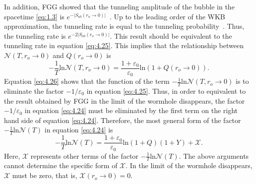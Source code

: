 \documentclass[12pt]{article}
\begin{document}
In addition, FGG showed that the tunneling amplitude of the bubble in the spacetime \eqref{eq:1.3} is $e^{-|S_{ab}(r_{o}\rightarrow 0)|}$~\cite{EAJ}. Up to the leading order of the WKB approximation, the tunneling rate is equal to the tunneling probability~\cite{SFVF,EJW}. Thus, the tunneling rate is $e^{-2|S_{ab}(r_{o}\rightarrow 0)|}$. This result should be equivalent to the tunneling rate in equation \eqref{eq:4.25}. This implies that the relationship between $\mathscr{N}(T, r_{o}\rightarrow 0 )$ and $Q(r_{o}\rightarrow 0)$ is
\begin{equation}
\label{eq:4.26}%
-\frac{1}{T}\mathrm{ln}\mathscr{N}(T, r_{o}\rightarrow 0 )=\frac{1+\varepsilon_{0}}{\varepsilon_{0}}\mathrm{ln}(1+Q(r_{o}\rightarrow0)).
\end{equation}
Equation \eqref{eq:4.26} shows that the function of the term $-\frac{1}{T}\mathrm{ln}\mathscr{N}(T, r_{o}\rightarrow 0 )$ is to eliminate the factor $-1/\varepsilon_{0}$ in equation \eqref{eq:4.25}. Thus, in order to equivalent to the result obtained by FGG in the limit of the wormhole disappears, the factor $-1/\varepsilon_{0}$ in equation \eqref{eq:4.24} must be eliminated by the first term on the right hand side of equation \eqref{eq:4.24}. Therefore, the most general form of the factor $-\frac{1}{T}\mathrm{ln}\mathscr{N}(T)$ in equation \eqref{eq:4.24} is
\begin{equation}
\label{eq:4.27}%
-\frac{1}{T}\mathrm{ln}\mathscr{N}(T)=\frac{1+\varepsilon_{0}}{\varepsilon_{0}}\mathrm{ln}(1+Q)(1+Y)+\mathscr{X}.
\end{equation}
Here, $\mathscr{X}$ represents other terms of the factor $-\frac{1}{T}\mathrm{ln}\mathscr{N}(T)$. The above arguments cannot determine the specific form of $\mathscr{X}$. In the limit of the wormhole disappears, $\mathscr{X}$ must be zero, that is, $\mathscr{X}(r_{o}\rightarrow0)=0$.
\end{document}
